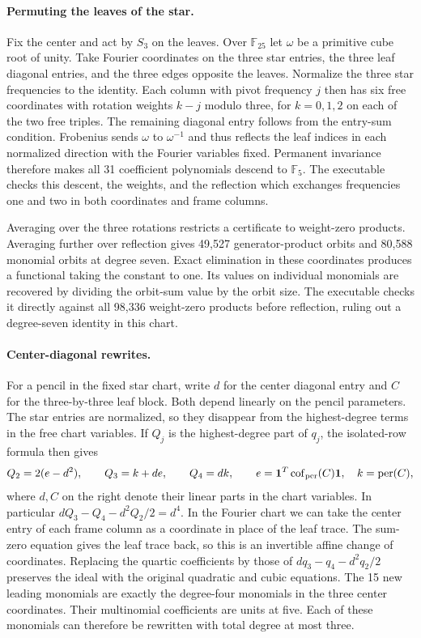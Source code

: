 \paragraph{Permuting the leaves of the star.}
Fix the center and act by \(S_3\) on the leaves. Over
\(\mathbb F_{25}\) let \(\omega\) be a primitive cube root of unity.
Take Fourier coordinates on the three star entries, the three leaf
diagonal entries, and the three edges opposite the leaves. Normalize
the three star frequencies to the identity. Each column with pivot
frequency \(j\) then has six free coordinates with rotation weights
\(k-j\) modulo three, for \(k=0,1,2\) on each of the two free
triples. The remaining diagonal entry follows from the entry-sum
condition. Frobenius sends \(\omega\) to \(\omega^{-1}\) and thus
reflects the leaf indices in each normalized direction with the
Fourier variables fixed. Permanent invariance therefore makes all
31 coefficient polynomials descend to \(\mathbb F_5\). The
executable checks this descent, the weights, and the reflection
which exchanges frequencies one and two in both coordinates and
frame columns.

Averaging over the three rotations restricts a certificate to
weight-zero products. Averaging further over reflection gives
49,527 generator-product orbits and 80,588 monomial orbits at
degree seven. Exact elimination in these coordinates produces
a functional taking the constant to one. Its values on individual
monomials are recovered by dividing the orbit-sum value by the
orbit size. The executable checks it directly against all 98,336
weight-zero products before reflection, ruling out a degree-seven
identity in this chart.

\paragraph{Center-diagonal rewrites.}
For a pencil in the fixed star chart, write \(d\) for the center
diagonal entry and \(C\) for the three-by-three leaf block.
Both depend linearly on the pencil parameters. The star entries
are normalized, so they disappear from the highest-degree terms
in the free chart variables. If \(Q_j\) is the highest-degree
part of \(q_j\), the isolated-row formula then gives
\[
 Q_2=2(e-d^2),\qquad Q_3=k+de,\qquad Q_4=dk,
 \qquad e=\mathbf1^T\operatorname{cof}_{\rm per}(C)\mathbf1,
 \quad k=\operatorname{per}(C),
\]
where \(d,C\) on the right denote their linear parts in the chart
variables. In particular \(dQ_3-Q_4-d^2Q_2/2=d^4\).
In the Fourier chart we can take the center entry of each frame
column as a coordinate in place of the leaf trace. The sum-zero
equation gives the leaf trace back, so this is an invertible affine
change of coordinates. Replacing the quartic coefficients by those
of \(d q_3-q_4-d^2q_2/2\) preserves the ideal with the original
quadratic and cubic equations. The 15 new leading monomials are
exactly the degree-four monomials in the three center coordinates.
Their multinomial coefficients are units at five. Each of these
monomials can therefore be rewritten with total degree at most three.

